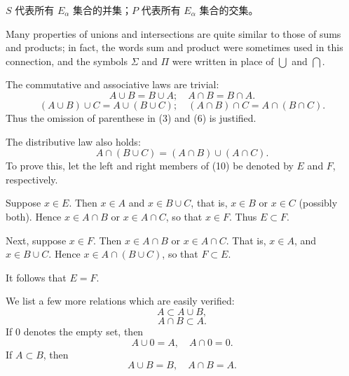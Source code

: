 \documentclass[../poma-notes.tex]{subfiles}
\begin{document}
\anote
$S$ 代表所有 $E_{\alpha}$ 集合的并集；$P$ 代表所有 $E_{\alpha}$ 集合的交集。

\begin{remark}
  Many properties of unions and intersections are quite similar to those of sums and products; in fact,
  the words sum and product were sometimes used in this connection, and the symbols $\Sigma$ and $\Pi$
  were written in place of $\bigcup$ and $\bigcap$.

  The commutative and associative laws are trivial:
  \begin{equation}
    A \cup B = B \cup A; \quad A \cap B = B \cap A.
  \end{equation}
  \begin{equation}
    (A \cup B) \cup C = A \cup (B \cup C); \quad (A \cap B) \cap C = A \cap (B \cap C).
  \end{equation}
  Thus the omission of parenthese in (3) and (6) is justified.

  The distributive law also holds:
  \begin{equation}
    A \cap (B \cup C) = (A \cap B) \cup (A \cap C).
  \end{equation}
  To prove this, let the left and right members of (10) be denoted by $E$ and $F$, respectively.

  Suppose $x \in E$. Then $x \in A$ and $x \in B \cup C$, that is, $x \in B$ or $x \in C$ (possibly both).
  Hence $x \in A \cap B$ or $x \in A \cap C$, so that $x \in F$. Thus $E \subset F$.

  Next, suppose $x \in F$. Then $x \in A \cap B$ or $x \in A \cap C$. That is, $x \in A$, and
  $x \in B \cup C$. Hence $x \in A \cap (B \cup C)$, so that $F \subset E$.

  It follows that $E = F$.

  We list a few more relations which are easily verified:
  \begin{equation}
    A \subset A \cup B,
  \end{equation}
  \begin{equation}
    A \cap B \subset A.
  \end{equation}
  If 0 denotes the empty set, then
  \begin{equation}
    A \cup 0 = A, \quad A \cap 0 = 0.
  \end{equation}
  If $A \subset B$, then
  \begin{equation}
    A \cup B = B, \quad A \cap B = A.
  \end{equation}
\end{remark}
\end{document}
